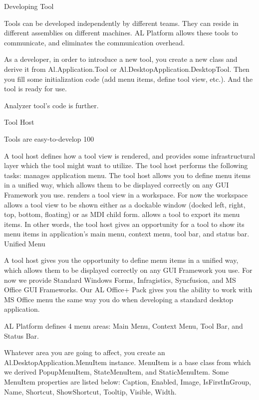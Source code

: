Developing Tool 

Tools can be developed independently by different teams. They can reside in different assemblies on different machines. AL Platform allows these tools to communicate, and eliminates the communication overhead.

As a developer, in order to introduce a new tool, you create a new class and derive it from Al.Application.Tool or Al.DesktopApplication.DesktopTool. Then you fill some initialization code (add menu items, define tool view, etc.). And the tool is ready for use.

Analyzer tool's code is further.

Tool Host

Tools are easy-to-develop 100%

A tool host defines how a tool view is rendered, and provides some infrastructural layer which the tool might want to utilize. The tool host performs the following tasks:
manages application menu. The tool host allows you to define menu items in a unified way, which allows them to be displayed correctly on any GUI Framework you use.
renders a tool view in a workspace. For now the workspace allows a tool view to be shown either as a dockable window (docked left, right, top, bottom, floating) or as MDI child form.
allows a tool to export its menu items. In other words, the tool host gives an opportunity for a tool to show its menu items in application's main menu, context menu, tool bar, and status bar.
Unified Menu

A tool host gives you the opportunity to define menu items in a unified way, which allows them to be displayed correctly on any GUI Framework you use. For now we provide Standard Windows Forms, Infragistics, Syncfusion, and MS Office GUI Frameworks. Our AL Office+ Pack gives you the ability to work with MS Office menu the same way you do when developing a standard desktop application.

AL Platform defines 4 menu areas: Main Menu, Context Menu, Tool Bar, and Status Bar.

Whatever area you are going to affect, you create an Al.DesktopApplication.MenuItem instance. MenuItem is a base class from which we derived PopupMenuItem, StateMenuItem, and StaticMenuItem. Some MenuItem properties are listed below:
Caption, Enabled, Image, IsFirstInGroup, Name, Shortcut, ShowShortcut, Tooltip, Visible, Width.

